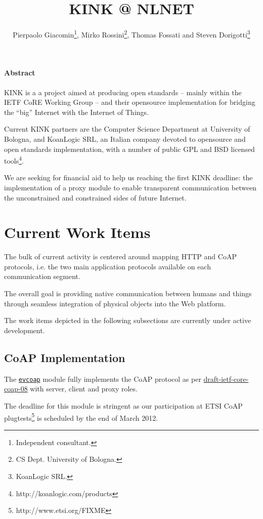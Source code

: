 \documentclass[12pt]{article}
\title{KINK @ NLNET}
\author{Pierpaolo Giacomin\footnote{Independent consultant.}, Mirko Rossini\footnote{CS Dept. University of Bologna.}, Thomas Fossati and Steven Dorigotti\footnote{KoanLogic SRL.}}
\newcommand{\swmod}[1]{\mbox{\texttt{#1}}}
\begin{document}
\maketitle
\tableofcontents

\paragraph{Abstract}
KINK is a a project aimed at producing open standards -- mainly within the IETF CoRE Working Group -- and their \mbox{opensource} implementation for bridging the ``big'' Internet with the Internet of Things.

Current KINK partners are the Computer Science Department at University of Bologna, and KoanLogic SRL, an Italian company devoted to \mbox{opensource} and open standards implementation, with a number of public GPL and BSD licensed tools\footnote{http://koanlogic.com/products}.

We are seeking for financial aid to help us reaching the first KINK deadline: the implementation of a proxy module to enable transparent communication between the unconstrained and constrained sides of future Internet.

\section{Current Work Items}
The bulk of current activity is centered around mapping HTTP and CoAP protocols, i.e. the two main application protocols available on each communication segment.

The overall goal is providing native communication between humans and things through seamless integration of physical objects into the Web platform.

The work items depicted in the following subsections are currently under active development.

\subsection{CoAP Implementation}
The \href{https://github.com/koanlogic/webthings/bits/evcoap}{\swmod{evcoap}} module fully implements the CoAP protocol as per \href{http://tools.ietf.org/html/draft-ietf-core-coap}{draft-ietf-core-coap-08} with server, client and proxy roles.

The deadline for this module is stringent as our participation at ETSI CoAP plugtests\footnote{http://www.etsi.org/FIXME} is scheduled by the end of March 2012.
\end{document}
